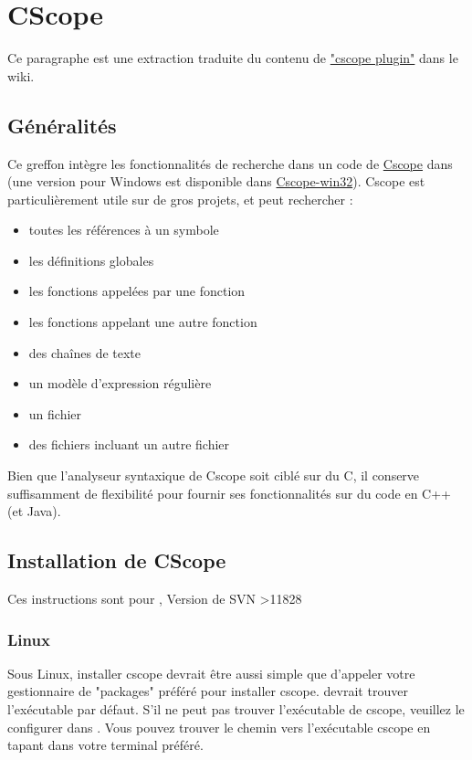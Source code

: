 \section{CScope}\label{sec:cscope}

Ce paragraphe est une extraction traduite du contenu de \href{https://wiki.codeblocks.org/index.php/Cscope_plugin}{"cscope plugin"} dans le wiki.

\subsection{Généralités}

Ce greffon intègre les fonctionnalités de recherche dans un code de \href{https://cscope.sourceforge.net/}{Cscope} dans \codeblocks (une version pour Windows est disponible dans \href{https://code.google.com/p/cscope-win32/}{Cscope-win32}). Cscope est particulièrement utile sur de gros projets, et peut rechercher :

\begin{itemize}[noitemsep]
\item toutes les références à un symbole
\item les définitions globales
\item les fonctions appelées par une fonction
\item les fonctions appelant une autre fonction
\item des chaînes de texte
\item un modèle d'expression régulière
\item un fichier
\item des fichiers incluant un autre fichier
\end{itemize}

Bien que l'analyseur syntaxique de Cscope soit ciblé sur du C, il conserve suffisamment de flexibilité pour fournir ses fonctionnalités sur du code en C++ (et Java).

\subsection{Installation de CScope}

Ces instructions sont pour \codeblocks, Version de SVN \textgreater  11828

\subsubsection{Linux}

Sous Linux, installer cscope devrait être aussi simple que d'appeler votre gestionnaire de "packages" préféré pour installer cscope. \codeblocks devrait trouver l'exécutable par défaut. S'il ne peut pas trouver l'exécutable de cscope, veuillez le configurer dans . Vous pouvez trouver le chemin vers l'exécutable cscope en tapant  dans votre terminal préféré.

